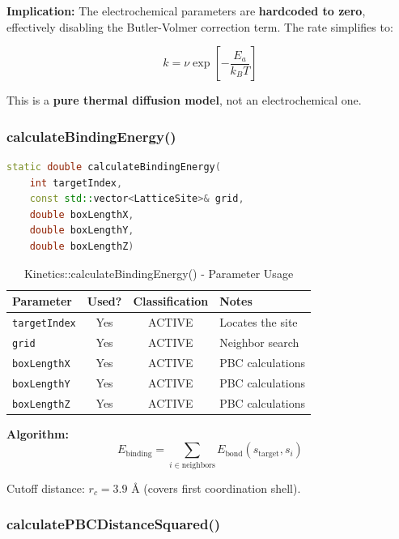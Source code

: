 \documentclass[11pt,a4paper]{article}
\begin{document}
\textbf{Implication:} The electrochemical parameters are \textbf{hardcoded to zero}, effectively disabling the Butler-Volmer correction term. The rate simplifies to:

\begin{equation}
k = \nu \exp\left[-\frac{E_a}{k_B T}\right]
\end{equation}

This is a \textbf{pure thermal diffusion model}, not an electrochemical one.

\newpage

\subsubsection{calculateBindingEnergy()}

\begin{lstlisting}[language=C++, breaklines=true]
static double calculateBindingEnergy(
    int targetIndex, 
    const std::vector<LatticeSite>& grid,
    double boxLengthX, 
    double boxLengthY, 
    double boxLengthZ)
\end{lstlisting}

\begin{table}[H]
\centering
\caption{Kinetics::calculateBindingEnergy() - Parameter Usage}
\begin{tabular}{|l|c|c|l|}
\hline
\textbf{Parameter} & \textbf{Used?} & \textbf{Classification} & \textbf{Notes} \\
\hline
\texttt{targetIndex} & Yes & ACTIVE & Locates the site \\
\texttt{grid} & Yes & ACTIVE & Neighbor search \\
\texttt{boxLengthX} & Yes & ACTIVE & PBC calculations \\
\texttt{boxLengthY} & Yes & ACTIVE & PBC calculations \\
\texttt{boxLengthZ} & Yes & ACTIVE & PBC calculations \\
\hline
\end{tabular}
\end{table}

\textbf{Algorithm:}
\begin{equation}
E_{\text{binding}} = \sum_{i \in \text{neighbors}} E_{\text{bond}}(s_{\text{target}}, s_i)
\end{equation}

Cutoff distance: $r_c = 3.9$ Å (covers first coordination shell).

\newpage

\subsubsection{calculatePBCDistanceSquared()}
\end{document}
